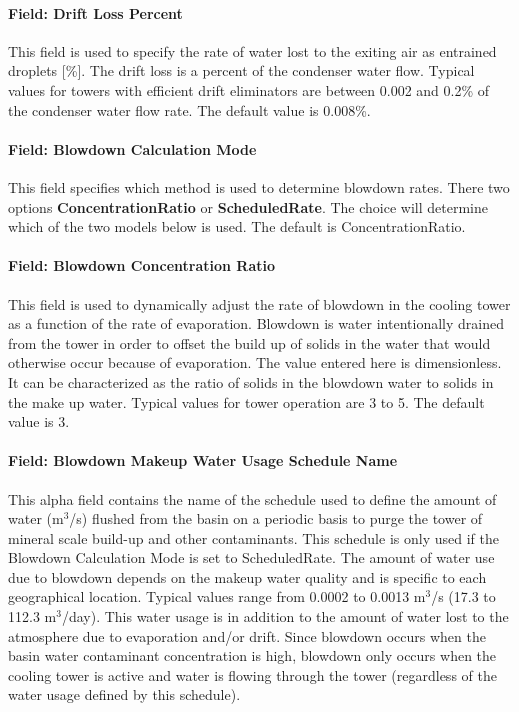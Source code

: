 \paragraph{Field: Drift Loss Percent}\label{field-drift-loss-percent-2}

This field is used to specify the rate of water lost to the exiting air as entrained droplets {[}\%{]}. The drift loss is a percent of the condenser water flow. Typical values for towers with efficient drift eliminators are between 0.002 and 0.2\% of the condenser water flow rate. The default value is 0.008\%.

\paragraph{Field: Blowdown Calculation Mode}\label{field-blowdown-calculation-mode-2}

This field specifies which method is used to determine blowdown rates. There two options \textbf{ConcentrationRatio} or \textbf{ScheduledRate}. The choice will determine which of the two models below is used. The default is ConcentrationRatio.

\paragraph{Field: Blowdown Concentration Ratio}\label{field-blowdown-concentration-ratio-2}

This field is used to dynamically adjust the rate of blowdown in the cooling tower as a function of the rate of evaporation. Blowdown is water intentionally drained from the tower in order to offset the build up of solids in the water that would otherwise occur because of evaporation. The value entered here is dimensionless. It can be characterized as the ratio of solids in the blowdown water to solids in the make up water. Typical values for tower operation are 3 to 5. The default value is 3.

\paragraph{Field: Blowdown Makeup Water Usage Schedule Name}\label{field-blowdown-makeup-water-usage-schedule-name-2}

This alpha field contains the name of the schedule used to define the amount of water (m\(^{3}\)/s) flushed from the basin on a periodic basis to purge the tower of mineral scale build-up and other contaminants. This schedule is only used if the Blowdown Calculation Mode is set to ScheduledRate. The amount of water use due to blowdown depends on the makeup water quality and is specific to each geographical location. Typical values range from 0.0002 to 0.0013 m\(^{3}\)/s (17.3 to 112.3 m\(^{3}\)/day). This water usage is in addition to the amount of water lost to the atmosphere due to evaporation and/or drift. Since blowdown occurs when the basin water contaminant concentration is high, blowdown only occurs when the cooling tower is active and water is flowing through the tower (regardless of the water usage defined by this schedule).

